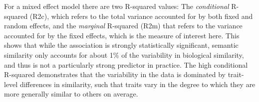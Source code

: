 For a mixed effect model there are two R-squared values: The \textit{conditional} R-squared (R2c), which refers to the total variance accounted for by both fixed and random effects, and the \textit{marginal} R-squared (R2m) that refers to the variance accounted for by the fixed effects, which is the measure of interest here.  This shows that while the association is strongly statistically significant, semantic similarity only accounts for about 1\% of the variability in biological similarity, and thus is not a particularly strong predictor in practice.  The high conditional R-squared demonstrates that the variability in the data is dominated by trait-level differences in similarity, such that traits vary in the degree to which they are more generally similar to others on average.